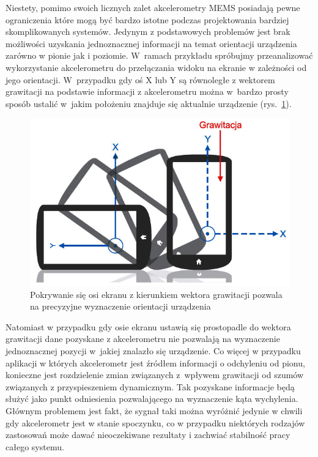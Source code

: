 Niestety, pomimo swoich licznych zalet akcelerometry MEMS posiadają pewne
ograniczenia które mogą być bardzo istotne podczas projektowania bardziej
skomplikowanych systemów. Jedynym z podstawowych problemów jest brak możliwości
uzyskania jednoznacznej informacji na temat orientacji urządzenia zarówno w
pionie jak i poziomie. W~ramach przykładu spróbujmy przeanalizować wykorzystanie
akcelerometru do przełączania widoku na ekranie w zależności od jego orientacji. 
W~przypadku gdy oś X lub Y są równoległe z wektorem grawitacji na podstawie
informacji z akcelerometru można w~bardzo prosty sposób ustalić w~jakim
położeniu znajduje się aktualnie urządzenie (rys.~\ref{fig:AkcelerometrOrientation}).
\begin{figure}[ht!]
 \centering
 \includegraphics[width=\textwidth]{../images/ch04/acc_orientation.png}
 \caption{Pokrywanie się osi ekranu z kierunkiem wektora grawitacji pozwala na
 precyzyjne wyznaczenie orientacji urządzenia\cite{website:elektronikab2b-zyroskop}}
 \label{fig:AkcelerometrOrientation}
\end{figure}

Natomiast w przypadku gdy osie ekranu ustawią się prostopadle do wektora
grawitacji dane pozyskane z akcelerometru nie pozwalają na wyznaczenie
jednoznacznej pozycji w~jakiej znalazło się urządzenie\cite{website:elektronikab2b-zyroskop}. Co więcej w
przypadku aplikacji w których akcelerometr jest źródłem informacji o odchyleniu
od pionu, konieczne jest rozdzielenie zmian związanych z~wpływem grawitacji od szumów
związanych z przyspieszeniem dynamicznym. Tak pozyskane informacje będą
służyć jako punkt odniesienia pozwalającego na wyznaczenie kąta wychylenia.
Głównym problemem jest fakt, że sygnał taki można wyróżnić jedynie w chwili gdy
akcelerometr jest w stanie spoczynku, co w przypadku niektórych rodzajów
zastosowań może dawać nieoczekiwane rezultaty i zachwiać stabilność pracy całego
systemu. 

